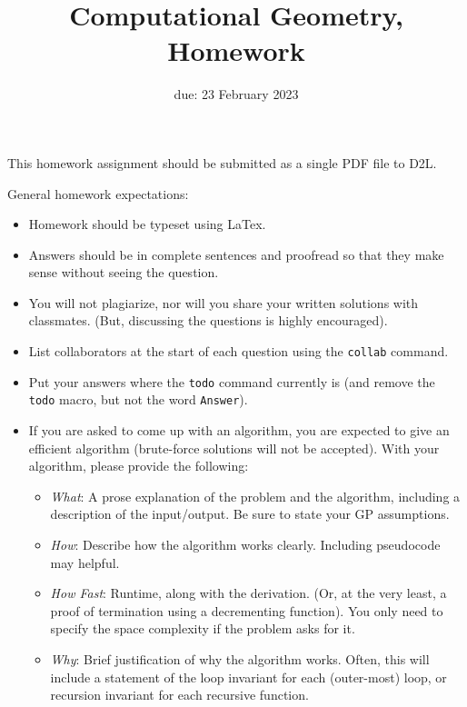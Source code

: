 \documentclass{article}
\title{Computational Geometry, Homework \hwnum}
\date{due: 23 February 2023}
\author{\todo{Your Name Here}}
\begin{document}
\maketitle

This homework assignment should be
submitted as a single PDF file to D2L.

General homework expectations:
\begin{itemize}
    \item Homework should be typeset using LaTex.
    \item Answers should be in complete sentences and proofread so that they
        make sense without seeing the question.
    \item You will not plagiarize, nor will you share your written solutions
        with classmates. (But, discussing the questions is highly encouraged).
    \item List collaborators at the start of each question using the
        \texttt{collab} command.
    \item Put your answers where the \texttt{todo} command currently is (and
        remove the \texttt{todo} macro, but not the word \texttt{Answer}).
    \item If you are asked to come up with an algorithm, you are
        expected to give an efficient algorithm (brute-force solutions will not
        be accepted). With your algorithm, please provide the following:
        \begin{itemize}
            \item \emph{What}: A prose explanation of the problem and the algorithm,
                including a description of the input/output.  Be sure to state
                your GP assumptions.
            \item \emph{How}: Describe how the algorithm works clearly.
                Including pseudocode may helpful.
            \item \emph{How Fast}: Runtime, along with the derivation.  (Or, at
                the very least, a proof of termination using a decrementing
                function).  You only need to specify the space complexity if the
                problem asks for it.
           \item \emph{Why}: Brief justification of why the algorithm works.
               Often, this will include a statement of the loop invariant for each
               (outer-most) loop, or recursion invariant for each recursive function.
        \end{itemize}
\end{itemize}
\end{document}
